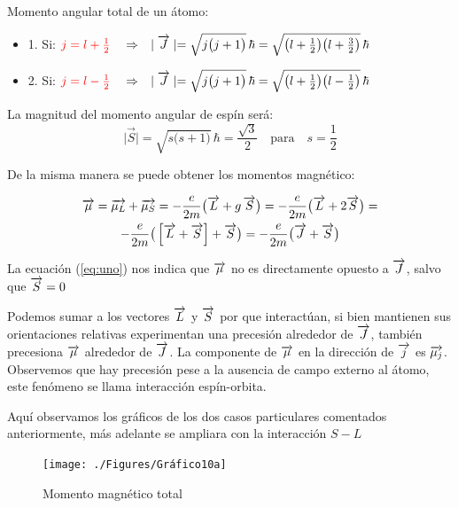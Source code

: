 	
Momento angular total de un átomo:
\begin{itemize}
	\item 1. Si:\; $\textcolor{red}{j=l+\frac{1}{2}} \quad\Rightarrow\quad \mid\overrightarrow{J}\mid =\sqrt{j\big(j+1\big)}\,\hbar = \sqrt{\big(l+\frac{1}{2}\big)\big(l+\frac{3}{2}\big)}\,\hbar$
	\item 2. Si:\; $\textcolor{red}{j=l-\frac{1}{2}} \quad\Rightarrow\quad \mid\overrightarrow{J}\mid =\sqrt{j\big(j+1\big)}\,\hbar = \sqrt{\big(l+\frac{1}{2}\big)\big(l-\frac{1}{2}\big)}\,\hbar$
\end{itemize}
	
La magnitud del momento angular de espín será:
\begin{equation}
 \mid\overrightarrow{S}\mid =\sqrt{s\big(s+1\big)}\,\hbar = \frac{\sqrt{3}}{2} \quad \text{para} \quad s=\frac{1}{2} 
\end{equation}

De la misma manera se puede obtener los momentos magnético:

\begin{multline}
  \overrightarrow{\mu}=\overrightarrow{\mu_{L}}+\overrightarrow{\mu_{S}}=-\frac{e}{2m}\big(\overrightarrow{L}+g\,\overrightarrow{S}\big)=-\frac{e}{2m}\big(\overrightarrow{L}+2\overrightarrow{S}\big)=\\
  -\frac{e}{2m}\big(\left[\overrightarrow{L}+\overrightarrow{S}\right]+\overrightarrow{S}\big)= -\frac{e}{2m}\big(\overrightarrow{J}+\overrightarrow{S}\big)
  \label{eq:uno}
\end{multline}

La ecuación (\ref{eq:uno}) nos indica que $\overrightarrow{\mu}$ no es directamente opuesto a $\overrightarrow{J}$, salvo que $\overrightarrow{S} = 0$

Podemos sumar a los vectores $\overrightarrow{L}$ y $\overrightarrow{S}$ por que interactúan, si bien mantienen sus orientaciones relativas experimentan una precesión alrededor de $\overrightarrow{J}$, también precesiona $\overrightarrow{\mu}$ alrededor de $\overrightarrow{J}$. La componente de $\overrightarrow{\mu}$ en la dirección de $\overrightarrow{j}$ es $\overrightarrow{\mu_{j}}$. Observemos que hay precesión pese a la ausencia de campo externo al átomo, este fenómeno se llama interacción espín-orbita.

Aquí observamos los gráficos de los dos casos particulares comentados anteriormente, más adelante se ampliara con la interacción $S-L$


\begin{figure}[H]
    \centering
    \texttt{[image: ./Figures/Gráfico10a]}
	\caption{Momento magnético total}
	\label{fig:Grafico10c}
\end{figure}


